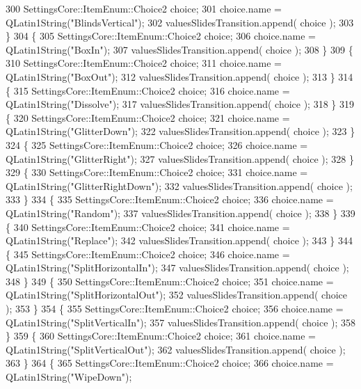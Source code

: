 \begin{DoxyCode}
300     SettingsCore::ItemEnum::Choice2 choice;
301     choice.name = QLatin1String(\textcolor{stringliteral}{"BlindsVertical"});
302     valuesSlidesTransition.append( choice );
303   \}
304   \{
305     SettingsCore::ItemEnum::Choice2 choice;
306     choice.name = QLatin1String(\textcolor{stringliteral}{"BoxIn"});
307     valuesSlidesTransition.append( choice );
308   \}
309   \{
310     SettingsCore::ItemEnum::Choice2 choice;
311     choice.name = QLatin1String(\textcolor{stringliteral}{"BoxOut"});
312     valuesSlidesTransition.append( choice );
313   \}
314   \{
315     SettingsCore::ItemEnum::Choice2 choice;
316     choice.name = QLatin1String(\textcolor{stringliteral}{"Dissolve"});
317     valuesSlidesTransition.append( choice );
318   \}
319   \{
320     SettingsCore::ItemEnum::Choice2 choice;
321     choice.name = QLatin1String(\textcolor{stringliteral}{"GlitterDown"});
322     valuesSlidesTransition.append( choice );
323   \}
324   \{
325     SettingsCore::ItemEnum::Choice2 choice;
326     choice.name = QLatin1String(\textcolor{stringliteral}{"GlitterRight"});
327     valuesSlidesTransition.append( choice );
328   \}
329   \{
330     SettingsCore::ItemEnum::Choice2 choice;
331     choice.name = QLatin1String(\textcolor{stringliteral}{"GlitterRightDown"});
332     valuesSlidesTransition.append( choice );
333   \}
334   \{
335     SettingsCore::ItemEnum::Choice2 choice;
336     choice.name = QLatin1String(\textcolor{stringliteral}{"Random"});
337     valuesSlidesTransition.append( choice );
338   \}
339   \{
340     SettingsCore::ItemEnum::Choice2 choice;
341     choice.name = QLatin1String(\textcolor{stringliteral}{"Replace"});
342     valuesSlidesTransition.append( choice );
343   \}
344   \{
345     SettingsCore::ItemEnum::Choice2 choice;
346     choice.name = QLatin1String(\textcolor{stringliteral}{"SplitHorizontalIn"});
347     valuesSlidesTransition.append( choice );
348   \}
349   \{
350     SettingsCore::ItemEnum::Choice2 choice;
351     choice.name = QLatin1String(\textcolor{stringliteral}{"SplitHorizontalOut"});
352     valuesSlidesTransition.append( choice );
353   \}
354   \{
355     SettingsCore::ItemEnum::Choice2 choice;
356     choice.name = QLatin1String(\textcolor{stringliteral}{"SplitVerticalIn"});
357     valuesSlidesTransition.append( choice );
358   \}
359   \{
360     SettingsCore::ItemEnum::Choice2 choice;
361     choice.name = QLatin1String(\textcolor{stringliteral}{"SplitVerticalOut"});
362     valuesSlidesTransition.append( choice );
363   \}
364   \{
365     SettingsCore::ItemEnum::Choice2 choice;
366     choice.name = QLatin1String(\textcolor{stringliteral}{"WipeDown"});

\end{DoxyCode}
